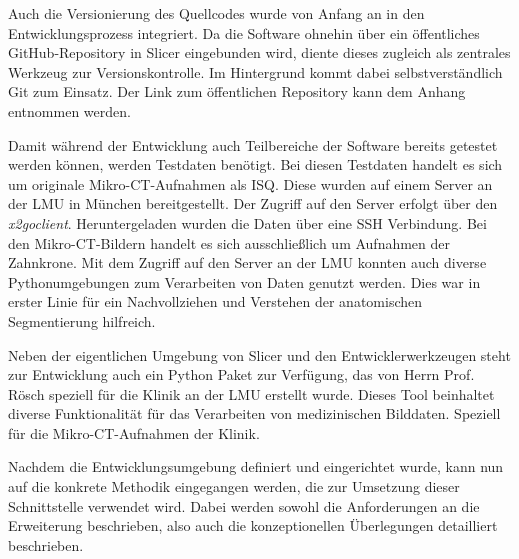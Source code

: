 Auch die Versionierung des Quellcodes wurde von Anfang an in den Entwicklungsprozess
integriert. Da die Software ohnehin über ein öffentliches GitHub-Repository in
Slicer eingebunden wird, diente dieses zugleich als zentrales Werkzeug zur Versionskontrolle.
Im Hintergrund kommt dabei selbstverständlich Git zum Einsatz. Der Link zum öffentlichen
Repository kann dem Anhang entnommen werden.

Damit während der Entwicklung auch Teilbereiche der Software bereits getestet werden
können, werden Testdaten benötigt. Bei diesen Testdaten handelt es sich um originale
Mikro-\ac{CT}-Aufnahmen als \ac{ISQ}. Diese wurden auf einem Server an der \ac{LMU}
in München bereitgestellt. Der Zugriff auf den Server erfolgt über den \textit{x2goclient}.
Heruntergeladen wurden die Daten über eine \ac{SSH} Verbindung. Bei den Mikro-\ac{CT}-Bildern
handelt es sich ausschließlich um Aufnahmen der Zahnkrone. Mit dem Zugriff auf
den Server an der \ac{LMU} konnten auch diverse Pythonumgebungen zum Verarbeiten
von Daten genutzt werden. Dies war in erster Linie für ein Nachvollziehen und
Verstehen der anatomischen Segmentierung hilfreich.

Neben der eigentlichen Umgebung von Slicer und den Entwicklerwerkzeugen steht
zur Entwicklung auch ein Python Paket zur Verfügung, das von Herrn Prof. Rösch
speziell für die Klinik an der \ac{LMU} erstellt wurde. Dieses Tool beinhaltet
diverse Funktionalität für das Verarbeiten von medizinischen Bilddaten. Speziell
für die Mikro-\ac{CT}-Aufnahmen der Klinik.

Nachdem die Entwicklungsumgebung definiert und eingerichtet wurde, kann nun auf die
konkrete Methodik eingegangen werden, die zur Umsetzung dieser Schnittstelle
verwendet wird. Dabei werden sowohl die Anforderungen an die Erweiterung beschrieben,
also auch die konzeptionellen Überlegungen detailliert beschrieben.


